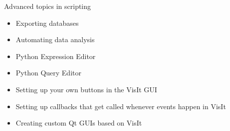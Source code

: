 \begin{frame}{Advanced topics in scripting}
  \begin{itemize}\setlength{\itemsep}{3mm}
  \item Exporting databases
  \item Automating data analysis
  \item Python Expression Editor
  \item Python Query Editor
  \item Setting up your own buttons in the VisIt GUI
  \item Setting up callbacks that get called whenever events happen in VisIt
  \item Creating custom Qt GUIs based on VisIt
  \end{itemize}
\end{frame}
